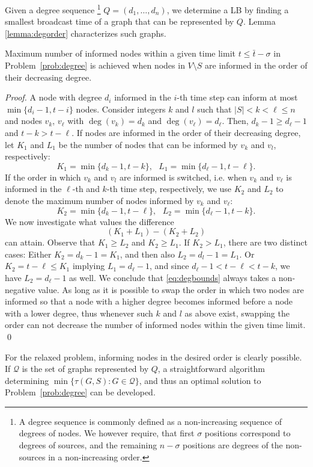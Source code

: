 Given a degree sequence 
\footnote{A degree sequence is commonly defined as a non-increasing sequence of degrees of nodes.
We however require, that first $\sigma$ positions correspond to degrees of sources, 
and the remaining $n-\sigma$ positions are degrees of the non-sources in a non-increasing order.} 
$Q=(d_1,\dots,d_n)$, we determine a LB by finding a smallest broadcast time of a graph that can be represented by $Q$.
Lemma \ref{lemma:degorder} characterizes such graphs.

\begin{lemma}
\label{lemma:degorder}
Maximum number of informed nodes within a given time limit $t\leq \bar{t} - \sigma$ in Problem~\ref{prob:degree} is achieved when nodes in $V\setminus S$ are informed 
in the order of their decreasing degree.
\end{lemma}
\begin{proof}

A node with degree $d_i$ informed in the $i$-th time step can inform at most $\min\{d_i-1,t-i\}$ nodes.
Consider integers  $k$ and $l$ such that $|S|< k < \ell\leq n$ and nodes $v_k$, $v_\ell$ with $\deg(v_k)=d_k$ and $\deg(v_\ell)=d_\ell$.
Then, $d_k-1\geq d_\ell-1$ and $t-k > t-\ell$.
If nodes are informed in the order of their decreasing degree, let $K_1$ and $L_1$ be the number of nodes that can be informed by $v_k$ and $v_l$, respectively:
$$
K_1=\min\{d_k-1,t-k\}, ~~~ L_1=\min\{d_\ell-1,t-\ell\}.
$$
If the order in which $v_k$ and $v_l$ are informed is switched, i.e. when $v_k$ and $v_\ell$ is informed in the $\ell$-th and $k$-th time step, respectively, 
we use $K_2$ and $L_2$ to denote the maximum number of nodes informed by $v_k$ and $v_\ell$:
$$
K_2=\min\{d_k-1,t-\ell\}, ~~~ L_2=\min\{d_\ell-1,t-k\}.
$$
We now investigate what values the difference 
\begin{equation}
\label{eq:degbounds}
(K_1+L_1)-(K_2+L_2)
\end{equation}
can attain.
Observe that $K_1\geq L_2$ and $K_2\geq L_1$. 
If $K_2>L_1$, there are two distinct cases:
Either $K_2=d_k-1=K_1$, and then also $L_2=d_l-1=L_1$.
Or $K_2=t-\ell\leq K_1$ implying $L_1 =d_\ell-1$, and since $d_\ell-1<t-\ell<t-k$, we have $L_2=d_\ell-1$ as well.
We conclude that \eqref{eq:degbounds} always takes a non-negative value.
As long as it is possible to swap the order in which two nodes are informed so that a node with a higher degree becomes informed before a node with a lower degree,
thus whenever such $k$ and $l$ as above exist, swapping the order can not decrease the number of informed nodes within the given time limit.
\qed
\end{proof}
For the relaxed problem, informing nodes in the desired order is clearly possible.
If $\mathcal{Q}$ is the set of graphs represented by $Q$, a straightforward algorithm determining
$\min\{\tau(G,S): G\in \mathcal{Q}\}$,
and thus an optimal solution to Problem~\ref{prob:degree} can be developed.

